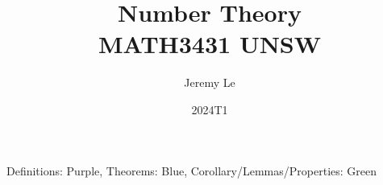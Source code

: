 \documentclass[12pt, letterpaper]{article}
\title{Number Theory \\ MATH3431 UNSW}
\author{Jeremy Le}
\date{2024T1}
\begin{document}
\maketitle

Definitions: Purple, Theorems: Blue, Corollary/Lemmas/Properties: Green
\tableofcontents
\newpage








\end{document}
